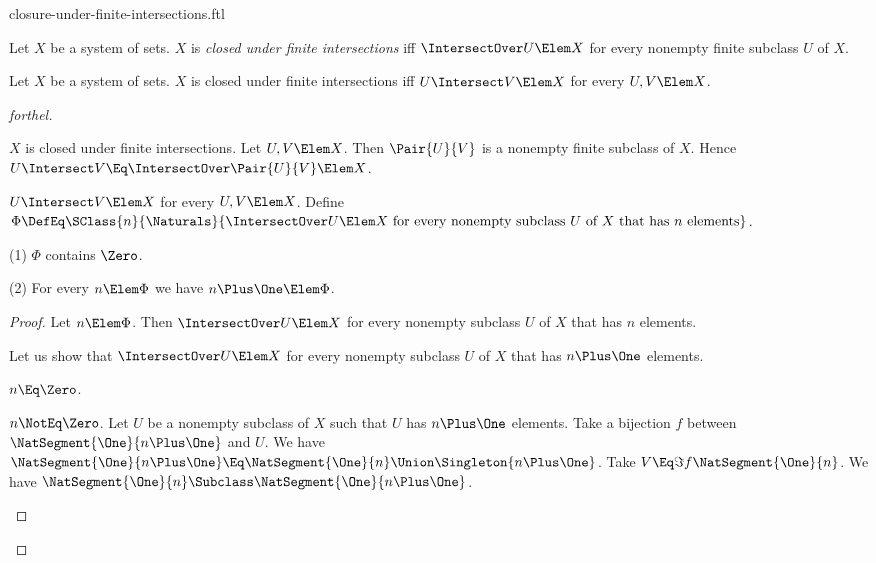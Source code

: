 \documentclass{stex}
\begin{document}
\begin{smodule}{closure-under-finite-intersections.ftl}



\begin{definition*}[forthel,for=closed under finite intersections]
  Let $X$ be a system of sets.
  $X$ is \emph{closed under finite intersections} iff $\IntersectOver U \Elem X$ for every nonempty finite subclass $U$ of $X$.
\end{definition*}

\begin{proposition*}[forthel]
  Let $X$ be a system of sets.
  $X$ is closed under finite intersections iff $U \Intersect V \Elem X$ for every $U, V \Elem X$.
\end{proposition*}
\begin{proof}[forthel]
  \begin{case}{$X$ is closed under finite intersections.}
    Let $U, V \Elem X$.
    Then $\Pair{U}{V}$ is a nonempty finite subclass of $X$.
    Hence $U \Intersect V \Eq \IntersectOver \Pair{U}{V} \Elem X$.
  \end{case}

  \begin{case}{$U \Intersect V \Elem X$ for every $U, V \Elem X$.}
    Define $\Phi \DefEq \SClass{n}{\Naturals}{\IntersectOver U \Elem X\text{ for every nonempty subclass }U\text{ of }X\text{ that has }n\text{ elements}}$.

    (1) $\Phi$ contains $\Zero$.

    (2) For every $n \Elem \Phi$ we have $n \Plus \One \Elem \Phi$.
    \begin{proof}
      Let $n \Elem \Phi$.
      Then $\IntersectOver U \Elem X$ for every nonempty subclass $U$ of $X$ that has $n$ elements.

      Let us show that $\IntersectOver U \Elem X$ for every nonempty subclass $U$ of $X$ that has $n \Plus \One$ elements.

        \begin{case}{$n \Eq \Zero$.} \end{case}

        \begin{case}{$n \NotEq \Zero$.}
          Let $U$ be a nonempty subclass of $X$ such that $U$ has $n \Plus \One$ elements.
          Take a bijection $f$ between $\NatSegment{\One}{n \Plus \One}$ and $U$.
          We have $\NatSegment{\One}{n \Plus \One} \Eq \NatSegment{\One}{n} \Union \Singleton{n \Plus \One}$.
          Take $V \Eq \Im{f}{\NatSegment{\One}{n}}$.
          We have $\NatSegment{\One}{n} \Subclass \NatSegment{\One}{n \Plus \One}$.


\end{case}
\end{proof}
\end{case}
\end{proof}
\end{smodule}
\end{document}
